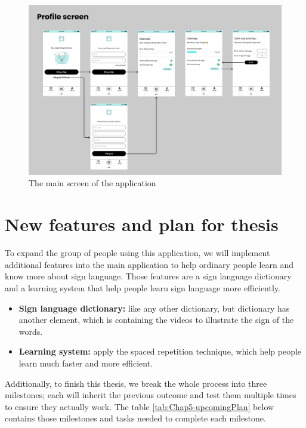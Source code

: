 \begin{figure}[H]
	\centering
	\includegraphics[width=\textwidth]{img/Chap5/Profile_screen.png}
	\caption{The main screen of the application}
\end{figure}

\section{New features and plan for thesis}

To expand the group of people using this application, we will implement additional features into the main application to help ordinary people learn and know more about sign language. Those features are a sign language dictionary and a learning system that help people learn sign language more efficiently.

\begin{itemize}
	\item \textbf{Sign language dictionary:} like any other dictionary, but dictionary has another element, which is containing the videos to illustrate the sign of the words.
	\item \textbf{Learning system:} apply the spaced repetition technique, which help people learn much faster and more efficient.
\end{itemize}

Additionally, to finish this thesis, we break the whole process into three milestones; each will inherit the previous outcome and test them multiple times to ensure they actually work. The table \ref{tab:Chap5-upcomingPlan} below contains those milestones and tasks needed to complete each milestone.


